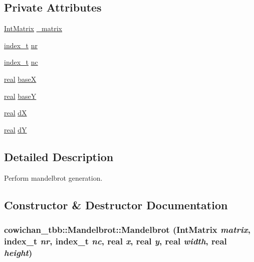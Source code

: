 \subsection*{Private Attributes}
\begin{CompactItemize}
\item 
\hyperlink{cowichan_8hpp_82321152ddeeefe9c61350a42ed9e7af}{IntMatrix} \hyperlink{classcowichan__tbb_1_1_mandelbrot_640971f00a9b5d3697efbe8b9a45a56c}{\_\-matrix}
\item 
\hyperlink{cowichan_8hpp_5b04577d5d21124855deaad298595371}{index\_\-t} \hyperlink{classcowichan__tbb_1_1_mandelbrot_698768b13a40cbab1410a4e162d1e450}{nr}
\item 
\hyperlink{cowichan_8hpp_5b04577d5d21124855deaad298595371}{index\_\-t} \hyperlink{classcowichan__tbb_1_1_mandelbrot_6eed478f27f441f57438392515f0f575}{nc}
\item 
\hyperlink{cowichan_8hpp_4d521b2c54a1f6312cc8fa04827eaf98}{real} \hyperlink{classcowichan__tbb_1_1_mandelbrot_f67b1fd96e5e4aecd37d5357f89770ed}{baseX}
\item 
\hyperlink{cowichan_8hpp_4d521b2c54a1f6312cc8fa04827eaf98}{real} \hyperlink{classcowichan__tbb_1_1_mandelbrot_0e35b59f83677269cec9b40812c97d3c}{baseY}
\item 
\hyperlink{cowichan_8hpp_4d521b2c54a1f6312cc8fa04827eaf98}{real} \hyperlink{classcowichan__tbb_1_1_mandelbrot_cbe2697988d27d656dcb12fcf06674c7}{dX}
\item 
\hyperlink{cowichan_8hpp_4d521b2c54a1f6312cc8fa04827eaf98}{real} \hyperlink{classcowichan__tbb_1_1_mandelbrot_8fc166fc3009c058ef4b6582755f5f52}{dY}
\end{CompactItemize}


\subsection{Detailed Description}
Perform mandelbrot generation. 

\subsection{Constructor \& Destructor Documentation}
\hypertarget{classcowichan__tbb_1_1_mandelbrot_2bfef0a80393e6547fb979f1d2135de6}{
\subsubsection[{Mandelbrot}]{\setlength{\rightskip}{0pt plus 5cm}cowichan\_\-tbb::Mandelbrot::Mandelbrot ({\bf IntMatrix} {\em matrix}, \/  {\bf index\_\-t} {\em nr}, \/  {\bf index\_\-t} {\em nc}, \/  {\bf real} {\em x}, \/  {\bf real} {\em y}, \/  {\bf real} {\em width}, \/  {\bf real} {\em height})}}
\label{classcowichan__tbb_1_1_mandelbrot_2bfef0a80393e6547fb979f1d2135de6}


